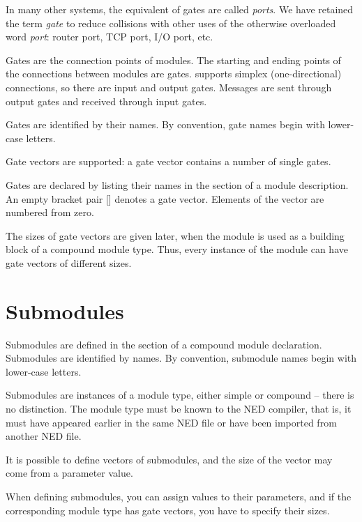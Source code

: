 \begin{note}
    In many other systems, the equivalent of \opp gates are called
    \textit{ports}. We have retained the term \textit{gate} to reduce
    collisions with other uses of the otherwise overloaded word
    \textit{port}: router port, TCP port, I/O port, etc.
\end{note}



Gates are the connection points of modules. The starting and
ending points of the connections between modules are gates. {\opp}
supports simplex (one-directional) connections, so there are
input and output gates. Messages are sent through
output gates and received through input gates.

Gates are identified by their names.
By convention, gate names begin with lower-case letters.

Gate vectors are supported: a gate vector
contains a number of single gates.

Gates are declared by listing their names in the
 section of a module description. An
empty bracket pair [] denotes a gate vector.
Elements of the vector are numbered from zero.


The sizes of gate vectors are given later, when the module is used as
a building block of a compound module type. Thus, every instance of
the module can have gate vectors of different sizes.


\section{Submodules}

Submodules are defined in the
 section of a compound
module declaration. Submodules are identified by names.
By convention, submodule names begin with lower-case letters.

Submodules are instances of a module type, either simple
or compound -- there is no distinction. The module type
must be known to the NED compiler, that is, it must have appeared
earlier in the same NED file or have been imported from another
NED file.

It is possible to define vectors of submodules, and the
size of the vector may come from a parameter value.

When defining submodules, you can assign values to their
parameters, and if the corresponding module type has gate vectors,
you have to specify their sizes.


